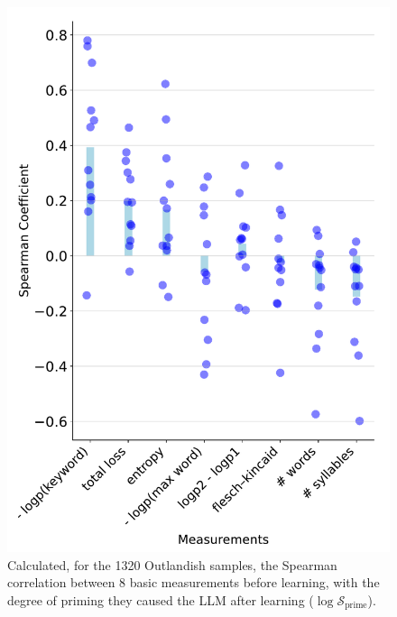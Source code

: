 \documentclass[11pt, a4paper, logo, copyright]{googledeepmind}
\theoremstyle{plain}
\theoremstyle{definition}
\theoremstyle{remark}
\begin{document}
\begin{figure}[h]
\vspace{0mm}
  \begin{minipage}[c]{0.55\textwidth}
    \centering \includegraphics[scale=.4,clip]{figures/Spearman.pdf}
  \end{minipage}\hfill
  \begin{minipage}[c]{0.4\textwidth}
    \vspace{-1mm}
    \caption{Calculated, for the 1320 Outlandish samples, the Spearman correlation between 8 basic measurements before learning, with the degree of priming they caused the LLM after learning ($\log \mathcal{S}_\text{prime}$).} \label{fig:Spearman}
  \end{minipage}
  \vspace{-0mm}
\end{figure}
\end{document}
